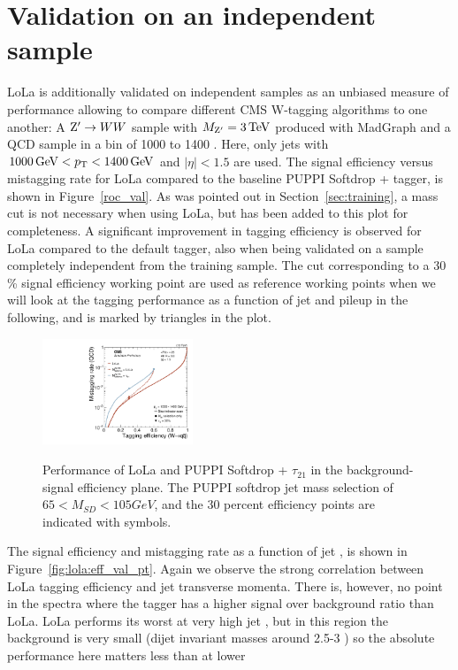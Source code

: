 \section{Validation on an independent sample}
\label{sec:validation}
LoLa is additionally validated on independent samples as an unbiased measure of performance allowing to compare different CMS W-tagging algorithms to one another: A $\mathrm{Z}^\prime \rightarrow WW$ sample with $M_{\mathrm{Z}^\prime}=3\,\text{Te\hspace{-.08em}V}$ produced with MadGraph and a QCD  sample in a \PT bin of 1000 to 1400 \GeV. Here, only jets with $ 1000 \,\text{Ge\hspace{-.08em}V} < p_{\mathrm{T}} < 1400 \,\text{Ge\hspace{-.08em}V}$ and $|\eta| < 1.5$ are used. The signal efficiency versus mistagging rate for LoLa compared to the baseline PUPPI Softdrop + \nsubj tagger, is shown in Figure~\ref{roc_val}. As was pointed out in Section~\ref{sec:training}, a mass cut is not necessary when using LoLa, but has been added to this plot for completeness. A significant improvement in tagging efficiency is observed for LoLa compared to the default tagger, also when being validated on a sample completely independent from the training sample. The cut corresponding to a 30 \% signal efficiency working point are used as reference working points when we will look at the tagging performance as a function of jet \PT and pileup in the following, and is marked by triangles in the plot.
\begin{figure}[h!]
\centering
\includegraphics[width=0.4\textwidth]{figures/vtagging/AN-18-099/validation/roc_ZpWqqvsQCD.pdf}\\
\caption{Performance of LoLa and PUPPI Softdrop + $\tau_{21}$ in the background-signal efficiency plane. The PUPPI softdrop jet mass
selection of $65 < M_{SD} < 105 GeV$, and the 30 percent efficiency points are indicated with symbols.}
\label{fig:roc_val}
\end{figure}
The signal efficiency and mistagging rate as a function of jet \PT, is shown in Figure~\ref{fig:lola:eff_val_pt}. Again we observe the strong correlation between LoLa tagging efficiency and jet transverse momenta. There is, however, no point in the spectra where the \nsubj tagger has a higher signal over background ratio than LoLa. LoLa performs its worst at very high jet \PT, but in this region the background is very small (dijet invariant masses around 2.5-3 \TeV) so the absolute performance here matters less than at lower \PT

